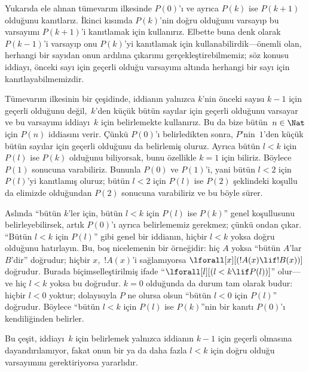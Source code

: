 \documentclass[../../../include/open-logic-section]{subfiles}
\begin{document}


Yukarıda ele alınan tümevarım ilkesinde $P(0)$'ı ve ayrıca $P(k)$ ise
$P(k+1)$ olduğunu kanıtlarız. İkinci kısımda $P(k)$'nin doğru olduğunu
varsayıp bu varsayımı $P(k+1)$'i kanıtlamak için kullanırız. Elbette
buna denk olarak $P(k-1)$'i varsayıp onu $P(k)$'yi kanıtlamak için
kullanabilirdik---önemli olan, herhangi bir sayıdan onun ardılına
çıkarımı gerçekleştirebilmemiz; söz konusu iddiayı, önceki sayı için
geçerli olduğu varsayımı altında herhangi bir sayı için
kanıtlayabilmemizdir.

Tümevarım ilkesinin bir çeşidinde, iddianın yalnızca $k$'nin önceki
sayısı $k-1$ için geçerli olduğunu değil,~$k$'den küçük bütün sayılar
için geçerli olduğunu varsayar ve bu varsayımı iddiayı~$k$ için
belirlemekte kullanırız. Bu da bize bütün~$n \in \Nat$ için $P(n)$
iddiasını verir. Çünkü $P(0)$'ı belirledikten sonra, $P$'nin~$1$'den
küçük bütün sayılar için geçerli olduğunu da belirlemiş oluruz. Ayrıca
bütün $l<k$ için $P(l)$ ise $P(k)$ olduğunu biliyorsak, bunu özellikle
$k=1$ için biliriz. Böylece $P(1)$ sonucuna varabiliriz. Bununla $P(0)$
ve $P(1)$'i, yani bütün $l<2$ için $P(l)$'yi kanıtlamış oluruz; bütün
$l<2$ için $P(l)$ ise $P(2)$ şeklindeki koşullu da elimizde olduğundan
$P(2)$ sonucuna varabiliriz ve bu böyle sürer.

Aslında ``bütün $k$'ler için, bütün $l<k$ için $P(l)$ ise $P(k)$''
genel koşullusunu belirleyebilirsek, artık $P(0)$'ı ayrıca belirlememiz
gerekmez; çünkü ondan çıkar. ``Bütün $l<k$ için $P(l)$'' gibi genel bir
iddianın, hiçbir $l<k$ yoksa doğru olduğunu hatırlayın. Bu, boş
nicelemenin bir örneğidir: hiç $A$ yoksa ``bütün $A$'lar $B$'dir''
doğrudur; hiçbir $x$,~$!A(x)$'i sağlamıyorsa
$\lforall[x][(!A(x) \lif !B(x))]$ doğrudur. Burada biçimselleştirilmiş
ifade ``$\lforall[l][(l < k \lif P(l))]$'' olur---ve hiç $l < k$ yoksa
bu doğrudur. $k=0$ olduğunda da durum tam olarak budur: hiçbir $l<0$
yoktur; dolayısıyla $P$ ne olursa olsun ``bütün $l<0$ için $P(l)$''
doğrudur. Böylece ``bütün $l<k$ için $P(l)$ ise $P(k)$''nin bir kanıtı
$P(0)$'ı kendiliğinden belirler.

Bu çeşit, iddiayı~$k$ için belirlemek yalnızca iddianın $k-1$ için
geçerli olmasına dayandırılamıyor, fakat onun bir ya da daha fazla
$l<k$ için doğru olduğu varsayımını gerektiriyorsa yararlıdır.
\end{document}
